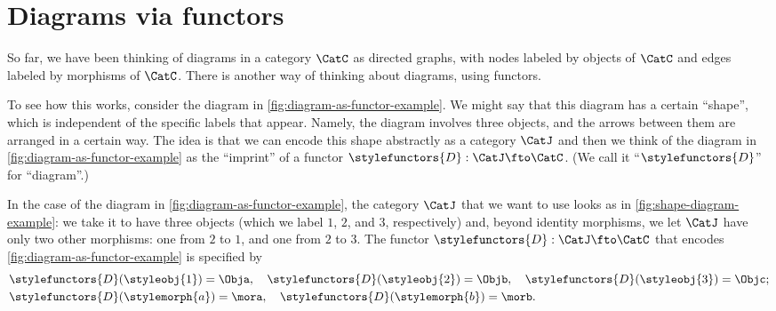 
\section{Diagrams via functors}


So far, we have been thinking of diagrams in a category $\CatC$ as directed graphs, with nodes labeled by objects of $\CatC$ and edges labeled by morphisms of $\CatC$. There is another way of thinking about diagrams, using functors. 

To see how this works, consider the diagram in \cref{fig:diagram-as-functor-example}. We might say that this diagram has a certain ``shape'', which is independent of the specific labels that appear. Namely, the diagram involves three objects, and the arrows between them are arranged in a certain way. The idea is that we can encode this shape abstractly as a category $\CatJ$ and then we think of the diagram in \cref{fig:diagram-as-functor-example} as the ``imprint'' of a functor $\stylefunctors{D}: \CatJ \fto \CatC$. (We call it ``$\stylefunctors{D}$'' for ``diagram''.)

\begin{marginfigure}
    \centering
    \caption{}
    \label{fig:diagram-as-functor-example}
\end{marginfigure}

\begin{marginfigure}
    \centering
    \caption{}
    \label{fig:shape-diagram-example}
\end{marginfigure}



In the case of the diagram in \cref{fig:diagram-as-functor-example}, the category $\CatJ$ that we want to use looks as in \cref{fig:shape-diagram-example}: we take it to have three objects (which we label $1$, $2$, and $3$, respectively) and, beyond identity morphisms, we let $\CatJ$ have only two other morphisms: one from $2$ to $1$, and one from $2$ to $3$. The functor $\stylefunctors{D}: \CatJ \fto \CatC$ that encodes \cref{fig:diagram-as-functor-example} is specified by 
\begin{align*}
& \stylefunctors{D}(\styleobj{1}) = \Obja, \quad \stylefunctors{D}(\styleobj{2}) = \Objb, \quad  \stylefunctors{D}(\styleobj{3}) = \Objc;  \\
& \stylefunctors{D}(\stylemorph{a}) = \mora, \quad \stylefunctors{D}(\stylemorph{b}) = \morb.
\end{align*}
